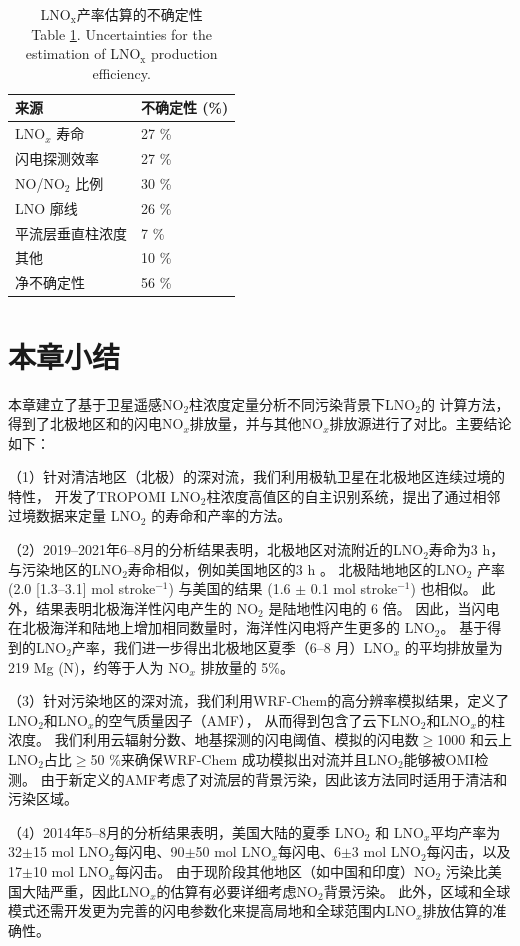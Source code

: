 \begin{table}[!htbp]
\caption{LNO$_\textrm{x}$产率估算的不确定性\\
Table \ref{table:uncertainty_china}. Uncertainties for the estimation of LNO$_\textrm{x}$ production efficiency.}
\begin{tabular}{ll}
\hline
\textbf{来源} & \textbf{不确定性 (\%)} \\
\hline
LNO$_x$ 寿命                & 27 \% \\
闪电探测效率  & 27 \% \\
NO/NO$_2$ 比例                 & 30 \% \\
LNO 廓线                     & 26 \% \\
平流层垂直柱浓度   & 7 \% \\
其他                          & 10 \% \\
\hline
净不确定性                             & 56 \% \\
\hline
\end{tabular}
\label{table:uncertainty_china}
\end{table}


\section{本章小结}

本章建立了基于卫星遥感NO$_2$柱浓度定量分析不同污染背景下LNO$_2$的
计算方法，得到了北极地区和的闪电NO$_x$排放量，并与其他NO$_x$排放源进行了对比。主要结论如下：

（1）针对清洁地区（北极）的深对流，我们利用极轨卫星在北极地区连续过境的特性，
开发了TROPOMI LNO$_2$柱浓度高值区的自主识别系统，提出了通过相邻过境数据来定量 LNO$_2$ 的寿命和产率的方法。

（2）2019--2021年6--8月的分析结果表明，北极地区对流附近的LNO$_2$寿命为3 h，与污染地区的LNO$_2$寿命相似，例如美国地区的3 h \citep{Nault.2017}。
北极陆地地区的LNO$_2$ 产率 (2.0 [1.3--3.1] mol stroke$^{-1}$) 与美国的结果 (1.6 $\pm$ 0.1 mol stroke$^{-1}$) 也相似\citep{Lapierre.2020}。
此外，结果表明北极海洋性闪电产生的 NO$_2$ 是陆地性闪电的 6 倍。
因此，当闪电在北极海洋和陆地上增加相同数量时，海洋性闪电将产生更多的 LNO$_2$。
基于得到的LNO$_2$产率，我们进一步得出北极地区夏季（6--8 月）LNO$_x$ 的平均排放量为219 Mg (N)，约等于人为 NO$_x$ 排放量的 5\%。

（3）针对污染地区的深对流，我们利用WRF-Chem的高分辨率模拟结果，定义了LNO$_2$和LNO$_x$的空气质量因子（AMF），
从而得到包含了云下LNO$_2$和LNO$_x$的柱浓度。
我们利用云辐射分数、地基探测的闪电阈值、模拟的闪电数$\geq$1000 和云上LNO$_2$占比$\geq$50 \%来确保WRF-Chem 成功模拟出对流并且LNO$_2$能够被OMI检测。
由于新定义的AMF考虑了对流层的背景污染，因此该方法同时适用于清洁和污染区域。

（4）2014年5--8月的分析结果表明，美国大陆的夏季 LNO$_2$ 和 LNO$_x$平均产率为32$\pm$15 mol LNO$_2$每闪电、90$\pm$50 mol LNO$_x$每闪电、6$\pm$3 mol LNO$_2$每闪击，以及17$\pm$10 mol LNO$_x$每闪击。
由于现阶段其他地区（如中国和印度）NO$_2$ 污染比美国大陆严重，因此LNO$_x$的估算有必要详细考虑NO$_2$背景污染。
此外，区域和全球模式还需开发更为完善的闪电参数化来提高局地和全球范围内LNO$_x$排放估算的准确性。
